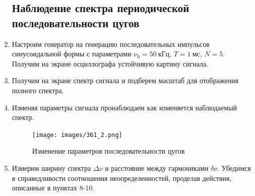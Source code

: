 \documentclass[14pt, a4paper]{report}
\begin{document}
\begin{enumerate}
\begin{figure}[H]
\centering
{}
\end{figure}

\subsection{Наблюдение спектра периодической последовательности цугов}

\item Настроим генератор на генерацию последовательных импульсов синусоидальной формы с параметрами $\nu_0=50\ кГц$, $T=1\ мс$, $N=5$. Получим на экране осциллографа устойчивую картину сигнала.

\item Получим на экране спектр сигнала и подберем масштаб для отображения полного спектра.

\item Изменяя параметры сигнала пронаблюдаем как изменяется наблюдаемый спектр.

\begin{figure}[H]
\centering
\texttt{[image: images/361\_2.png]}
\caption{Изменение параметров последовательности цугов}
\end{figure}

\item Измерим ширину спектра $\Delta\nu$ и расстояние между гармониками $\delta\nu$. Убедимся в справедливости соотношения неопределенностей, проделав действия, описанные в пунктах 8-10. 

\begin{table}[H]
\centering
{}
\end{table}


\end{enumerate}
\end{document}
